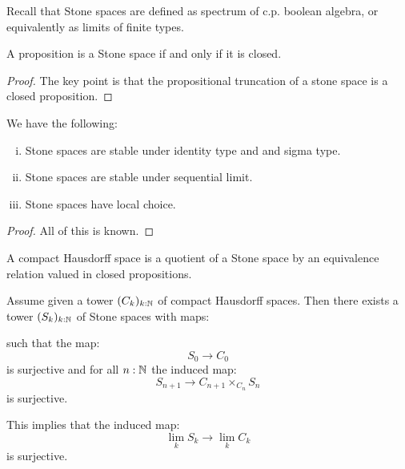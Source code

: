 Recall that Stone spaces are defined as spectrum of c.p. boolean algebra, or equivalently as limits of finite types.

\begin{lemma}
A proposition is a Stone space if and only if it is closed.
\end{lemma}

\begin{proof}
The key point is that the propositional truncation of a stone space is a closed proposition.
\end{proof}

\begin{theorem}
We have the following:
\begin{enumerate}[(i)]
\item Stone spaces are stable under identity type and and sigma type.
\item Stone spaces are stable under sequential limit.
\item Stone spaces have local choice.
\end{enumerate}
\end{theorem}

\begin{proof}
All of this is known.
\end{proof}

\begin{definition}
A compact Hausdorff space is a quotient of a Stone space by an equivalence relation valued in closed propositions.
\end{definition}

\begin{lemma}\label{sequential-limit-Hausdorff}
Assume given a tower $(C_k)_{k:\mathbb{N}}$ of compact Hausdorff spaces. Then there exists a tower $(S_k)_{k:\mathbb{N}}$ of Stone spaces with maps:

\begin{center}
\end{center}

such that the map:
\[S_0\to C_0\]
is surjective and for all $n:\mathbb{N}$ the induced map:
\[S_{n+1} \to C_{n+1}\times_{C_n} S_n\]
is surjective.

This implies that the induced map:
\[\lim_kS_k \to \lim_k C_k\]
is surjective.
\end{lemma}

